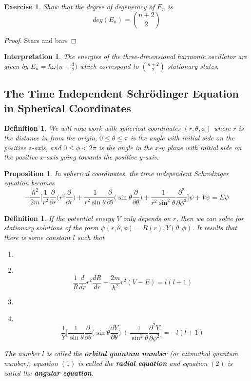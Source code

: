 \documentclass[12pt]{amsart}
\newtheorem{prop}[thm]{Proposition}
\newtheorem{defn}[thm]{Definition}
\newtheorem{intp}[thm]{Interpretation}
\newtheorem{ex}[thm]{Exercise}
\newcommand{\sch}{Schr\"{o}dinger }
\newcommand\Item[1][]{%
  \ifx\relax#1\relax  \item \else \item[#1] \fi
  \abovedisplayskip=0pt\abovedisplayshortskip=0pt~\vspace*{-\baselineskip}}
\newcommand{\om}{\omega}
\newcommand{\p}[1]{\frac{\partial}{\partial{#1}}}
\begin{document}
\begin{ex}
	Show that the degree of degeneracy of $E_n$ is $$deg(E_n) = {n+2 \choose 2}$$
\end{ex}

\begin{proof}
	Stars and bars
\end{proof}

\begin{intp}
	The energies of the three-dimensional harmonic oscillator are given by $E_n = \hbar \om \bigg( n + \frac{3}{2}\bigg)$ which correspond to $ n+2 \choose 2$ stationary states.
\end{intp} 


\subsection{The Time Independent \sch Equation in Spherical Coordinates}

\begin{defn}
We will now work with spherical coordinates $(r, \theta, \phi)$ where $r$ is the distance in from the origin, $0 \leq \theta \leq \pi$ is the angle with initial side on the positive $z$-axis, and $0 \leq \phi < 2\pi$ is the angle in the $x$-$y$ plane with initial side on the positive $x$-axis going towards the positive $y$-axis.
\end{defn}

\begin{prop}
In spherical coordinates, the time independent \sch equation becomes $$-\frac{\hbar^2}{2m}\bigg[ \frac{1}{r^2} \p{r}\bigg( r^2 \p{r}\bigg) + \frac{1}{r^2 \sin \theta} \p{\theta} \bigg( \sin \theta \p{\theta}\bigg) + \frac{1}{r^2 \sin^2 \theta} \frac{\partial^2}{\partial \phi^2}  \bigg] \psi + V \psi = E \psi$$
\end{prop}

\begin{defn}
If the potential energy $V$ only depends on $r$, then we can solve for stationary solutions of the form $\psi(r, \theta, \phi) = R(r), Y(\theta, \phi)$. It results that there is some constant $l$ such that 

\begin{enumerate}
\Item 
$$\frac{1}{R} \frac{d}{dr} r^2 \frac{dR}{dr} - \frac{2m}{\hbar^2}r^2(V -E) = l(l+1)$$ \vspace{3mm}
\Item 
$$\frac{1}{Y}\bigg[\frac{1}{\sin \theta}\p{\theta} \bigg(\sin \theta \frac{\partial Y}{\partial \theta} \bigg) + \frac{1}{\sin^2 \theta}\frac{\partial^2Y}{\partial \phi^2} \bigg] = -l(l+1)$$

\end{enumerate} \vspace{3mm}
The number $l$ is called the \textbf{orbital quantum number} (or azimuthal quantum number), equation $(1)$ is called the \textbf{radial equation} and equation $(2)$ is called the \textbf{angular equation}. 
\end{defn}
\end{document}
